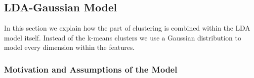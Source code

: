 \documentclass[11pt,a4paper]{article}
\begin{document}
% 
%  
% 
% 

\subsection{LDA-Gaussian Model}
In this section we explain how the part of clustering is combined within the LDA model itself. Instead of the k-means clusters we use a Gaussian distribution to model every dimension within the features.


\subsubsection{Motivation and Assumptions of the Model}
 
\end{document}
